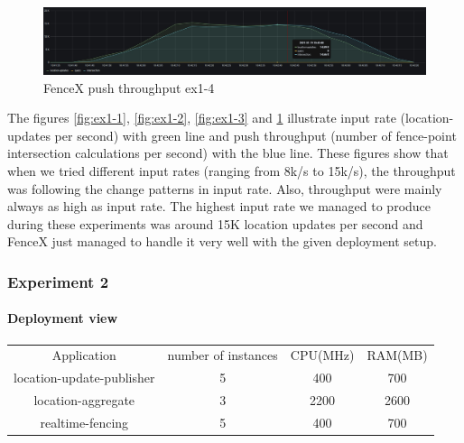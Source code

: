 \documentclass[a4]{report}
\begin{document}
        \begin{figure}[ht]
            \caption{FenceX push throughput ex1-4}
            \label{fig:ex1-4}
            \includegraphics[scale=0.4]{images/evaluation/ex1-benchmarking(23,10).png}
        \end{figure}

        The figures \ref{fig:ex1-1}, \ref{fig:ex1-2}, \ref{fig:ex1-3} and \ref{fig:ex1-4} illustrate input rate
        (location-updates per second) with green line and push throughput (number of fence-point intersection
        calculations per second) with the blue line.
        These figures show that when we tried different input rates (ranging from 8k/s to 15k/s), the throughput was
        following the change patterns in input rate.
        Also, throughput were mainly always as high as input rate.
        The highest input rate we managed to produce during these experiments was around 15K location updates per second
        and FenceX just managed to handle it very well with the given deployment setup.

        \subsubsection{Experiment 2}

        \paragraph{Deployment view}
        \begin{center}
            \begin{tabular}{ c c c c }
                Application               & number of instances & CPU(MHz) & RAM(MB) \\
                location-update-publisher & 5                   & 400      & 700     \\
                location-aggregate        & 3                   & 2200     & 2600    \\
                realtime-fencing          & 5                   & 400      & 700     \\
            \end{tabular}
        \end{center}
\end{document}
